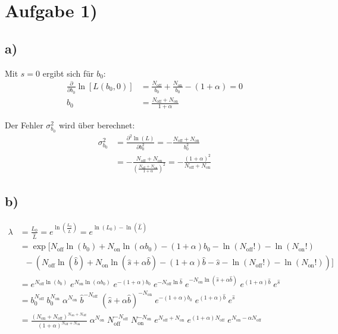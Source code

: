 \section*{Aufgabe 1)}
\subsection*{a)}
Mit $s = 0$ ergibt sich für $b_0$:
\begin{align*}
	\frac{\partial}{\partial b_0} \ln[L(b_0,0)] &= \frac{N_\text{off}}{b_0} + \frac{N_\text{on}}{b_0} - (1+\alpha) = 0 \\
	b_0 &= \frac{N_\text{off} + N_\text{on}}{1+\alpha}
\end{align*}

Der Fehler $\sigma_{b_0}^2$ wird über berechnet:
\begin{align*}
	\sigma_{b_0}^2 &= \frac{\partial^2 \ln(L)}{\partial b_0^2} = -\frac{N_\text{off} + N_\text{on}}{b_0^2}	\\
	&= -\frac{N_\text{off} + N_\text{on}} {\left(\frac{N_\text{off} + N_\text{on}}{1+\alpha}\right)^2}	= -\frac{(1 + \alpha)^2}{N_\text{off} + N_\text{on}}
\end{align*}



\subsection*{b)}
\begin{align*}
	\lambda &= \frac{L_0}{\hat{L}} = e^{\ln\left(\frac{L_0}{\hat{L}}\right)} =
	e^{\ln(L_0) - \ln(\hat{L})}	\\
	&= \exp[N_\text{off} \ln(b_0) + N_\text{on} \ln(\alpha b_0) - (1+\alpha)b_0 - \ln(N_\text{off}!) - \ln(N_\text{on}!)	\\
	& \;\;-(N_\text{off} \ln(\hat{b}) + N_\text{on} \ln(\hat{s}+\alpha\hat{b}) - (1+\alpha)\hat{b} - \hat{s} - \ln(N_\text{off}!) - \ln(N_\text{on}!) )]	\\
	&= e^{N_\text{off} \ln(b_0)}\; e^{N_\text{on} \ln(\alpha b_0)}\; e^{-(1+\alpha)b_0}\; e^{-N_\text{off} \ln{\hat{b}}}\; e^{-N_\text{on} \ln(\hat{s}+ \alpha\hat{b})}\; e^{(1+\alpha)\hat{b}}\; e^{\hat{s}}	\\
	&= b_0^{N_\text{off}}\; b_0^{N_\text{on}}\; \alpha^{N_\text{on}}\; \hat{b}^{-N_\text{off}}\; (\hat{s}+\alpha\hat{b})^{-N_\text{on}}\; e^{-(1+\alpha)b_0}\; e^{(1+\alpha)\hat{b}} \; e^{\hat{s}}	\\
	&=\frac{(N_\text{on}+N_\text{off})^{N_\text{on}+N_\text{off}}}{(1+\alpha)^{N_\text{off}+N_\text{on}}}\; \alpha^{N_\text{on}}\; N_\text{off}^{-N_\text{off}}\; N_\text{on}^{-N_\text{on}}\; e^{N_\text{off} + N_\text{on}}\; e^{(1+\alpha)N_\text{off}}\; e^{N_\text{on} - \alpha{N_\text{off}}}
\end{align*}

